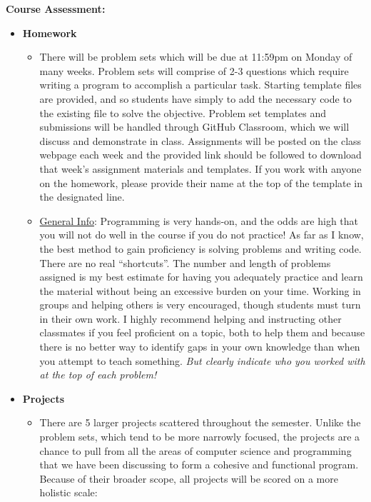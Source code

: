 \documentclass[11pt]{article}
\begin{document}
\newpage
\textbf {\large Course Assessment:}
\begin{itemize}
	\item \textbf {Homework}
		\begin{itemize}
			\item There will be problem sets which will be due at 11:59pm on Monday of many weeks. Problem sets will comprise of 2-3 questions which require writing a program to accomplish a particular task. Starting template files are provided, and so students have simply to add the necessary code to the existing file to solve the objective. Problem set templates and submissions will be handled through GitHub Classroom, which we will discuss and demonstrate in class. Assignments will be posted on the class webpage each week and the provided link should be followed to download that week's assignment materials and templates. If you work with anyone on the homework, please provide their name at the top of the template in the designated line.
			\item \underline{General Info}: Programming is very hands-on, and the odds are high that you will not do well in the course if you do not practice! As far as I know, the best method to gain proficiency is solving problems and writing code. There are no real ``shortcuts''. The number and length of problems assigned is my best estimate for having you adequately practice and learn the material without being an excessive burden on your time. Working in groups and helping others is very encouraged, though students must turn in their own work. I highly recommend helping and instructing other classmates if you feel proficient on a topic, both to help them and because there is no better way to identify gaps in your own knowledge than when you attempt to teach something. \emph{But clearly indicate who you worked with at the top of each problem!}
		\end{itemize}
	\item \textbf{Projects}
		\begin{itemize}
			\item There are 5 larger projects scattered throughout the semester. Unlike the problem sets, which tend to be more narrowly focused, the projects are a chance to pull from all the areas of computer science and programming that we have been discussing to form a cohesive and functional program. Because of their broader scope, all projects will be scored on a more holistic scale:
				\begin{center}
					\small
					\begin{tabular}{cp{10cm}}

\end{tabular}
\end{center}
\end{itemize}
\end{itemize}
\end{document}
